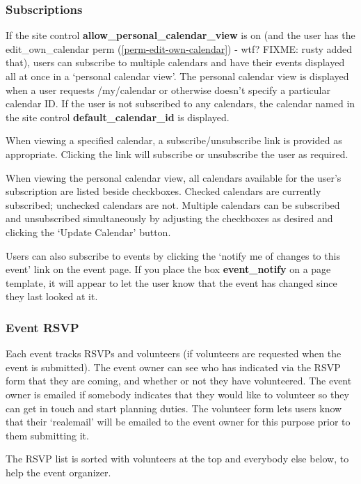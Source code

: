 \subsubsection{Subscriptions}
\label{features-calendar-subscription}

If the site control {\bf allow\_personal\_calendar\_view} is on (and the user has the edit\_own\_calendar perm (\ref{perm-edit-own-calendar}) - wtf? FIXME: rusty added that), users can subscribe to multiple calendars and have their events displayed all at once in a `personal calendar view'. The personal calendar view is displayed when a user requests /my/calendar or otherwise doesn't specify a particular calendar ID. If the user is not subscribed to any calendars, the calendar named in the site control {\bf default\_calendar\_id} is displayed.

When viewing a specified calendar, a subscribe/unsubscribe link is provided as appropriate. Clicking the link will subscribe or unsubscribe the user as required.

When viewing the personal calendar view, all calendars available for the user's subscription are listed beside checkboxes. Checked calendars are currently subscribed; unchecked calendars are not. Multiple calendars can be subscribed and unsubscribed simultaneously by adjusting the checkboxes as desired and clicking the `Update Calendar' button.

Users can also subscribe to events by clicking the `notify me of changes to this event' link on the event page. If you place the box {\bf event\_notify} on a page template, it will appear to let the user know that the event has changed since they last looked at it.

\subsubsection{Event RSVP}
\label{features-calendar-rsvp}

Each event tracks RSVPs and volunteers (if volunteers are requested when the event is submitted). The event owner can see who has indicated via the RSVP form that they are coming, and whether or not they have volunteered. The event owner is emailed if somebody indicates that they would like to volunteer so they can get in touch and start planning duties. The volunteer form lets users know that their `realemail' will be emailed to the event owner for this purpose prior to them submitting it.

The RSVP list is sorted with volunteers at the top and everybody else below, to help the event organizer.


